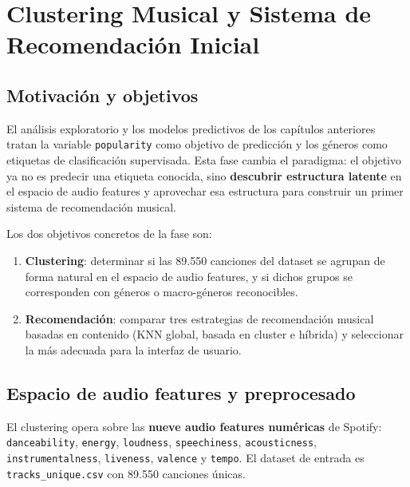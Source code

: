\documentclass[12pt, a4paper]{book}
\theoremstyle{definition}
\begin{document}
\tableofcontents
\clearpage

\chapter{Clustering Musical y Sistema de Recomendación Inicial}
\label{ch:clustering}

\section{Motivación y objetivos}

El análisis exploratorio y los modelos predictivos de los capítulos anteriores
tratan la variable \texttt{popularity} como objetivo de predicción y los
géneros como etiquetas de clasificación supervisada. Esta fase cambia el
paradigma: el objetivo ya no es predecir una etiqueta conocida, sino
\textbf{descubrir estructura latente} en el espacio de audio features y
aprovechar esa estructura para construir un primer sistema de recomendación
musical.

Los dos objetivos concretos de la fase son:
\begin{enumerate}
  \item \textbf{Clustering}: determinar si las 89.550 canciones del dataset se
        agrupan de forma natural en el espacio de audio features, y si dichos
        grupos se corresponden con géneros o macro-géneros reconocibles.
  \item \textbf{Recomendación}: comparar tres estrategias de recomendación
        musical basadas en contenido (KNN global, basada en cluster e híbrida)
        y seleccionar la más adecuada para la interfaz de usuario.
\end{enumerate}

\section{Espacio de audio features y preprocesado}
\label{sec:preprocesado_cluster}

El clustering opera sobre las \textbf{nueve audio features numéricas} de Spotify:
\texttt{danceability}, \texttt{energy}, \texttt{loudness}, \texttt{speechiness},
\texttt{acousticness}, \texttt{instrumentalness}, \texttt{liveness},
\texttt{valence} y \texttt{tempo}. El dataset de entrada es
\texttt{tracks\_unique.csv} con 89.550 canciones únicas.
\end{document}
